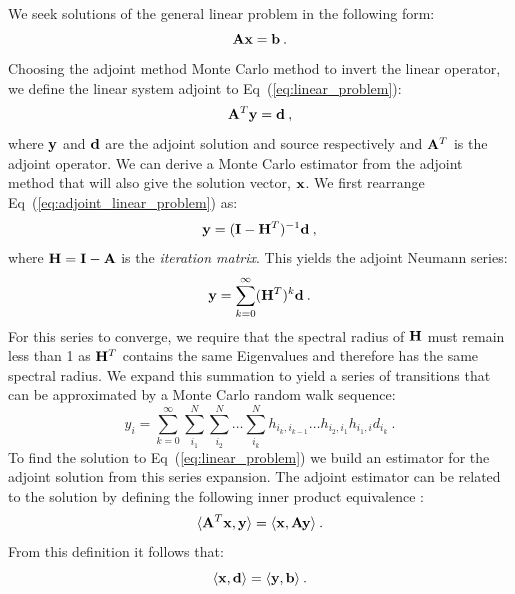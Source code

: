 \documentclass{mc2013}
\begin{document}
We seek solutions of the general linear problem in the following form:
\begin{equation}
  \mathbf{A} \mathbf{x} = \mathbf{b}\:.
  \label{eq:linear_problem}
\end{equation}
Choosing the adjoint method Monte Carlo method to invert the linear
operator, we define the linear system adjoint to
Eq~(\ref{eq:linear_problem}):
\begin{equation}
  \mathbf{A}^T \mathbf{y} = \mathbf{d}\:,
  \label{eq:adjoint_linear_problem}
\end{equation}
where $\mathbf{y}$ and $\mathbf{d}$ are the adjoint solution and source
respectively and $\mathbf{A}^T$ is the adjoint operator. We can derive a
Monte Carlo estimator from the adjoint method that will also give the
solution vector, $\mathbf{x}$. We first rearrange
Eq~(\ref{eq:adjoint_linear_problem}) as:
\begin{equation}
  \mathbf{y} = (\mathbf{I} - \mathbf{H}^T)^{-1} \mathbf{d}\:,
  \label{eq:adjoint_split_system_2}
\end{equation}
where $\mathbf{H} = \mathbf{I} - \mathbf{A}$ is the \textit{iteration matrix}.
This yields the adjoint Neumann series:
\begin{equation}
  \mathbf{y} = \sum_{k=0}^{\infty} (\mathbf{H}^T)^k\mathbf{d}\:.
  \label{eq:adjoint_neumann_series}
\end{equation}
For this series to converge, we require that the spectral radius of
$\mathbf{H}$ must remain less than 1 as $\mathbf{H}^T$ contains the same
Eigenvalues and therefore has the same spectral radius. We expand this
summation to yield a series of transitions that can be approximated by
a Monte Carlo random walk sequence:
\begin{equation}
  y_i = \sum_{k=0}^{\infty}\sum_{i_1}^{N}\sum_{i_2}^{N}\ldots
  \sum_{i_k}^{N}h_{i_k,i_{k-1}}\ldots h_{i_2,i_1} h_{i_1,i} d_{i_k}\:.
  \label{eq:adjoint_neumann_solution}
\end{equation}
To find the solution to Eq~(\ref{eq:linear_problem}) we build an
estimator for the adjoint solution from this series expansion. The
adjoint estimator can be related to the solution by defining the
following inner product equivalence \cite{spanier_monte_1969}:
\begin{equation}
  \langle \mathbf{A}^T \mathbf{x}, \mathbf{y} \rangle = \langle \mathbf{x}, \mathbf{A}
  \mathbf{y} \rangle\:.
  \label{eq:adjoint_operator_product}
\end{equation}
From this definition it follows that:
\begin{equation}
  \langle \mathbf{x}, \mathbf{d} \rangle = \langle \mathbf{y}, \mathbf{b} \rangle\:.
  \label{eq:adjoint_vector_relation}
\end{equation}
\end{document}
